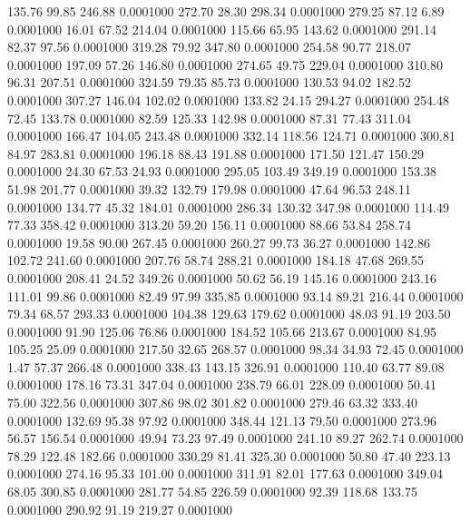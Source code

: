  135.76   99.85  246.88   0.0001000
 272.70   28.30  298.34   0.0001000
 279.25   87.12    6.89   0.0001000
  16.01   67.52  214.04   0.0001000
 115.66   65.95  143.62   0.0001000
 291.14   82.37   97.56   0.0001000
 319.28   79.92  347.80   0.0001000
 254.58   90.77  218.07   0.0001000
 197.09   57.26  146.80   0.0001000
 274.65   49.75  229.04   0.0001000
 310.80   96.31  207.51   0.0001000
 324.59   79.35   85.73   0.0001000
 130.53   94.02  182.52   0.0001000
 307.27  146.04  102.02   0.0001000
 133.82   24.15  294.27   0.0001000
 254.48   72.45  133.78   0.0001000
  82.59  125.33  142.98   0.0001000
  87.31   77.43  311.04   0.0001000
 166.47  104.05  243.48   0.0001000
 332.14  118.56  124.71   0.0001000
 300.81   84.97  283.81   0.0001000
 196.18   88.43  191.88   0.0001000
 171.50  121.47  150.29   0.0001000
  24.30   67.53   24.93   0.0001000
 295.05  103.49  349.19   0.0001000
 153.38   51.98  201.77   0.0001000
  39.32  132.79  179.98   0.0001000
  47.64   96.53  248.11   0.0001000
 134.77   45.32  184.01   0.0001000
 286.34  130.32  347.98   0.0001000
 114.49   77.33  358.42   0.0001000
 313.20   59.20  156.11   0.0001000
  88.66   53.84  258.74   0.0001000
  19.58   90.00  267.45   0.0001000
 260.27   99.73   36.27   0.0001000
 142.86  102.72  241.60   0.0001000
 207.76   58.74  288.21   0.0001000
 184.18   47.68  269.55   0.0001000
 208.41   24.52  349.26   0.0001000
  50.62   56.19  145.16   0.0001000
 243.16  111.01   99.86   0.0001000
  82.49   97.99  335.85   0.0001000
  93.14   89.21  216.44   0.0001000
  79.34   68.57  293.33   0.0001000
 104.38  129.63  179.62   0.0001000
  48.03   91.19  203.50   0.0001000
  91.90  125.06   76.86   0.0001000
 184.52  105.66  213.67   0.0001000
  84.95  105.25   25.09   0.0001000
 217.50   32.65  268.57   0.0001000
  98.34   34.93   72.45   0.0001000
   1.47   57.37  266.48   0.0001000
 338.43  143.15  326.91   0.0001000
 110.40   63.77   89.08   0.0001000
 178.16   73.31  347.04   0.0001000
 238.79   66.01  228.09   0.0001000
  50.41   75.00  322.56   0.0001000
 307.86   98.02  301.82   0.0001000
 279.46   63.32  333.40   0.0001000
 132.69   95.38   97.92   0.0001000
 348.44  121.13   79.50   0.0001000
 273.96   56.57  156.54   0.0001000
  49.94   73.23   97.49   0.0001000
 241.10   89.27  262.74   0.0001000
  78.29  122.48  182.66   0.0001000
 330.29   81.41  325.30   0.0001000
  50.80   47.40  223.13   0.0001000
 274.16   95.33  101.00   0.0001000
 311.91   82.01  177.63   0.0001000
 349.04   68.05  300.85   0.0001000
 281.77   54.85  226.59   0.0001000
  92.39  118.68  133.75   0.0001000
 290.92   91.19  219.27   0.0001000
